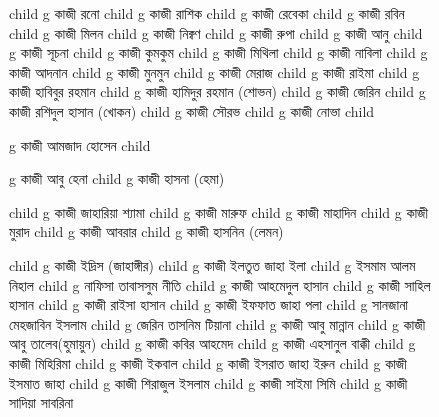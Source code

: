 \documentclass{article}
\begin{document}
\begin{figure}
{\begin{genealogypicture}
{{{{              child{    g{ কাজী রনো  } child{    g{ কাজী রাশিক  }   }   }
              child{    g{ কাজী রেবেকা } 
                  child{    g{ কাজী রবিন }   }
                  child{    g{ কাজী মিলন }   }
                  child{    g{ কাজী নিক্বণ }   }
                  child{    g{ কাজী রুপা }   }
              }
              child{    g{ কাজী আনু  } child{    g{ কাজী সূচনা }   }  }
              child{    g{ কাজী কুমকুম}
                    child{    g{ কাজী মিথিলা}   }
                    child{    g{ কাজী নাবিলা }   }
                    child{    g{ কাজী আদনান }   }
              }
              child{    g{ কাজী মুনমুন }
                  child{    g{ কাজী মেরাজ }   }
                  child{    g{ কাজী রাইমা }   }
              }
          }
          child{    g{ কাজী হাবিবুর রহমান }  
              child{    g{ কাজী হামিদুর রহমান (শোভন)  }
                  child{ g{ কাজী জেরিন }  }
              }
              child{    g{ কাজী রশিদুল হাসান (খোকন)  }
                  child{ g{ কাজী সৌরভ }  }
                  child{ g{ কাজী নোভা }  }
              }
          }
          child{    g{ কাজী আমজাদ হোসেন } 
          child{    g{ কাজী আবু হেনা }
          child{ g{ কাজী হাসনা (হেমা) } }

            child{ g{ কাজী জাহারিয়া শ্যামা  }   }
            child{ g{ কাজী মারুফ  }
                child{ g{ কাজী মাহাদিন }  }
              }
            child{ g{ কাজী মুরাদ }
                child{ g{ কাজী আবরার }  }
              }
            child{ g{ কাজী হাসনিন (লেমন) }  }
          }
          child{    g{ কাজী ইদ্রিস (জাহাঙ্গীর) }
                child{ g{ কাজী ইলতুত জাহা ইলা } 
                      child{ g{ ইসমাম আলম নিহাল  }  }
                      child{ g{ নাফিসা তাবাসসুম নীতি }  }
                 } 
                child{ g{ কাজী আহমেদুল হাসান } 
                    child{ g{ কাজী সাহিল হাসান }  }
                    child{ g{ কাজী রাইসা হাসান }  }
                 }
                 child{ g{ কাজী ইফফাত জাহা পলা }
                      child{ g{ সানজানা মেহজাবিন ইসলাম  }  }
                      child{ g{ জেরিন তাসনিম টিয়ানা }  }
                   }
            }
          child{    g{ কাজী আবু মান্নান }   }
          child{   
            g{ কাজী আবু তালেব(হুমায়ুন)  }
              child{ g{ কাজী কবির আহমেদ  }  }
              child{ g{ কাজী এহসানুল বাক্কী }
                  child{ g{ কাজী মিহিরিমা }  }
              }
          }
          child{    g{ কাজী ইকবাল } 
                child{ g{ কাজী ইসরাত জাহা ইরুন }  }
                child{ g{ কাজী ইসমাত জাহা }  }
            }
          child{    g{ কাজী শিরাজুল ইসলাম }  
              child{ g{ কাজী সাইমা সিমি }  }
              child{ g{ কাজী সাদিয়া সাবরিনা }  }
           }
        
}}}}
\end{genealogypicture}}
\end{figure}
\end{document}
